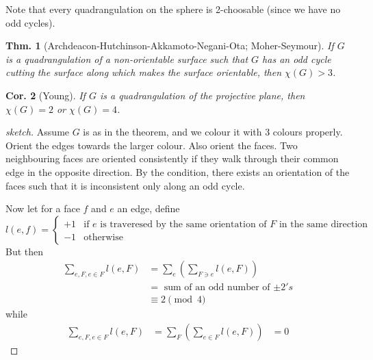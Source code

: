 \documentclass[12pt, a4paper]{book}
\newtheorem{theorem}{Thm.}[section]
\newtheorem{corollary}[theorem]{Cor.}
\theoremstyle{nonumberplain}
\newtheorem{proof}{Proof}
\begin{document}
Note that every quadrangulation on the sphere is 2-choosable (since we have no odd cycles).
\begin{theorem}[Archdeacon-Hutchinson-Akkamoto-Negani-Ota; Moher-Seymour]
    If $G$ is a quadrangulation of a non-orientable surface such that $G$ has an odd cycle cutting the surface along which makes the surface orientable, then $\chi(G)>3$.
\end{theorem}
\begin{corollary}[Young]
    If $G$ is a quadrangulation of the projective plane, then $\chi(G)=2$ or $\chi(G)=4$.
\end{corollary}
\begin{proof}[sketch]
    Assume $G$ is as in the theorem, and we colour it with 3 colours properly.
    Orient the edges towards the larger colour.
    Also orient the faces.
    Two neighbouring faces are oriented consistently if they walk through their common edge in the opposite direction.
    By the condition, there exists an orientation of the faces such that it is inconsistent only along an odd cycle.
    
    Now let for a face $f$ and $e$ an edge, define
    \begin{equation*}l(e,f)=
        \begin{cases}
            +1 &\text{if $e$ is traveresed by the same orientation of $F$ in the same direction}\\
            -1 &\text{otherwise}
        \end{cases}
    \end{equation*}
    But then
    \begin{align*}
        \sum\limits_{e,F,e\in F}l(e,F) &= \sum\limits_{e}\left(\sum\limits_{F\ni e} l(e,F)\right)\\
                                       &= \text{ sum of an odd number of $\pm 2's$}\\
                                       &\equiv 2\pmod{4}
    \end{align*}
    while
    \begin{align*}
        \sum\limits_{e,F,e\in F}l(e,F) &= \sum\limits_{F}\left(\sum\limits_{e\in F} l(e,F)\right)
                                       &= 0
    \end{align*}
\end{proof}
\end{document}
